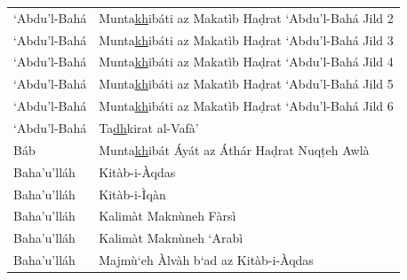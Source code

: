\documentclass[12pt, oneside]{report}
\begin{document}
\begin{appendix}
\begin{table}[ht]
\begin{tabular}{ll}
	`Abdu'l-Bah\'{a}	& Munta\underline{kh}ib\'{a}ti az Makat\`{i}b Ha\d{d}rat `Abdu'l-Bah\'{a} Jild 2 \\
	`Abdu'l-Bah\'{a}	& Munta\underline{kh}ib\'{a}ti az Makat\`{i}b Ha\d{d}rat `Abdu'l-Bah\'{a} Jild 3 \\
	`Abdu'l-Bah\'{a}	& Munta\underline{kh}ib\'{a}ti az Makat\`{i}b Ha\d{d}rat `Abdu'l-Bah\'{a} Jild 4 \\
	`Abdu'l-Bah\'{a}	& Munta\underline{kh}ib\'{a}ti az Makat\`{i}b Ha\d{d}rat `Abdu'l-Bah\'{a} Jild 5 \\
	`Abdu'l-Bah\'{a}	& Munta\underline{kh}ib\'{a}ti az Makat\`{i}b Ha\d{d}rat `Abdu'l-Bah\'{a} Jild 6 \\
	`Abdu'l-Bah\'{a}	& Ta\underline{dh}kirat al-Vaf\`{a}' \\
	B\'{a}b & Munta\underline{kh}ib\'{a}t \'{A}y\'{a}t az \'{A}th\'{a}r Ha\d{d}rat Nuq\d{t}eh Awl\`{a} \\
	Baha'u'll\'{a}h & Kit\`{a}b-i-\`{A}qdas \\
	Baha'u'll\'{a}h & Kit\`{a}b-i-\`{I}q\`{a}n \\
	Baha'u'll\'{a}h & Kalim\`{a}t Makn\`{u}neh F\`{a}rs\`{i} \\
	Baha'u'll\'{a}h & Kalim\`{a}t Makn\`{u}neh `Arab\`{i} \\
	Baha'u'll\'{a}h & Majm\`{u}`eh \`{A}lv\`{a}h b`ad az Kit\`{a}b-i-\`{A}qdas \\

	\end{tabular}
\end{table}
\end{appendix}
\singlespacing
\printbibliography
\end{document}
